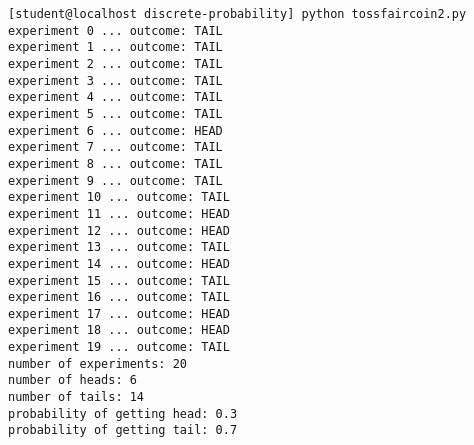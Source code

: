 {\footnotesize \begin{Verbatim}[frame=single,fontsize=\small]
[student@localhost discrete-probability] python tossfaircoin2.py
experiment 0 ... outcome: TAIL
experiment 1 ... outcome: TAIL
experiment 2 ... outcome: TAIL
experiment 3 ... outcome: TAIL
experiment 4 ... outcome: TAIL
experiment 5 ... outcome: TAIL
experiment 6 ... outcome: HEAD
experiment 7 ... outcome: TAIL
experiment 8 ... outcome: TAIL
experiment 9 ... outcome: TAIL
experiment 10 ... outcome: TAIL
experiment 11 ... outcome: HEAD
experiment 12 ... outcome: HEAD
experiment 13 ... outcome: TAIL
experiment 14 ... outcome: HEAD
experiment 15 ... outcome: TAIL
experiment 16 ... outcome: TAIL
experiment 17 ... outcome: HEAD
experiment 18 ... outcome: HEAD
experiment 19 ... outcome: TAIL
number of experiments: 20
number of heads: 6
number of tails: 14
probability of getting head: 0.3
probability of getting tail: 0.7
\end{Verbatim}
}
